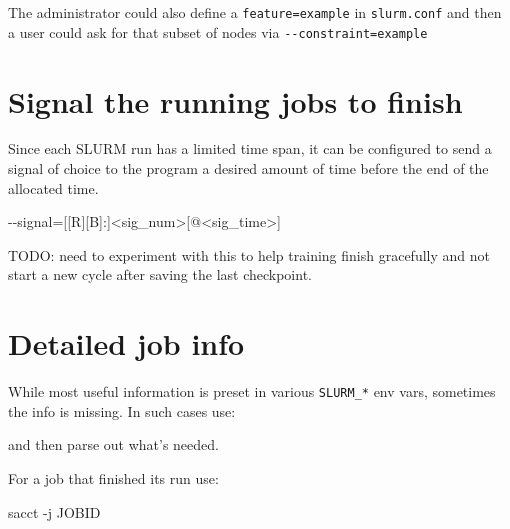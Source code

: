 \documentclass[
]{report}
\newenvironment{Shaded}{\begin{snugshade}}{\end{snugshade}}
\newcommand{\AttributeTok}[1]{\textcolor[rgb]{0.40,0.45,0.13}{#1}}
\newcommand{\ExtensionTok}[1]{\textcolor[rgb]{0.00,0.23,0.31}{#1}}
\newcommand{\NormalTok}[1]{\textcolor[rgb]{0.00,0.23,0.31}{#1}}
\newcommand{\OperatorTok}[1]{\textcolor[rgb]{0.37,0.37,0.37}{#1}}
\newcommand{\VariableTok}[1]{\textcolor[rgb]{0.07,0.07,0.07}{#1}}
\begin{document}
The administrator could also define a \texttt{feature=example} in
\texttt{slurm.conf} and then a user could ask for that subset of nodes
via \texttt{-\/-constraint=example}

\section{Signal the running jobs to
finish}\label{signal-the-running-jobs-to-finish}

Since each SLURM run has a limited time span, it can be configured to
send a signal of choice to the program a desired amount of time before
the end of the allocated time.

\begin{Shaded}
\begin{Highlighting}[]
\ExtensionTok{{-}{-}signal=[[R][B]:]}\OperatorTok{\textless{}}\NormalTok{sig\_num}\OperatorTok{\textgreater{}}\NormalTok{[@}\OperatorTok{\textless{}}\NormalTok{sig\_time}\OperatorTok{\textgreater{}}\NormalTok{]}
\end{Highlighting}
\end{Shaded}

TODO: need to experiment with this to help training finish gracefully
and not start a new cycle after saving the last checkpoint.

\section{Detailed job info}\label{detailed-job-info}

While most useful information is preset in various \texttt{SLURM\_*} env
vars, sometimes the info is missing. In such cases use:

\begin{Shaded}
\end{Shaded}

and then parse out what's needed.

For a job that finished its run use:

\begin{Shaded}
\begin{Highlighting}[]
\ExtensionTok{sacct} \AttributeTok{{-}j}\NormalTok{ JOBID}
\end{Highlighting}
\end{Shaded}
\end{document}
